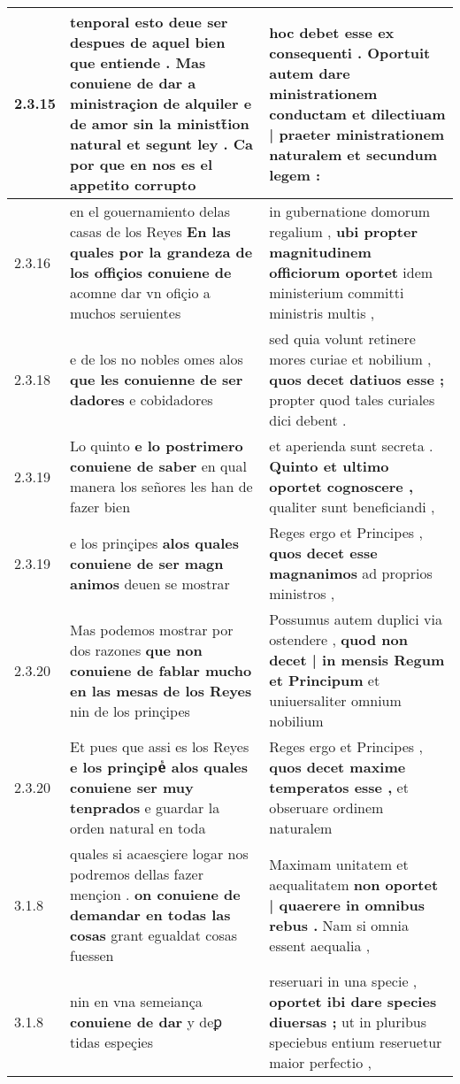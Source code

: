 \begin{tabular}{|p{1cm}|p{6.5cm}|p{6.5cm}|}
2.3.15 & tenporal esto deue ser despues de aquel bien que entiende . \textbf{ Mas conuiene de dar a ministraçion de alquiler e de amor sin la ministt̃ion natural et segunt ley . } Ca por que en nos es el appetito corrupto & hoc debet esse ex consequenti . \textbf{ Oportuit autem dare ministrationem conductam et dilectiuam | praeter ministrationem naturalem } et secundum legem : \\\hline
2.3.16 & en el gouernamiento delas casas de los Reyes \textbf{ En las quales por la grandeza de los offiçios conuiene de } acomne dar vn ofiçio a muchos seruientes & in gubernatione domorum regalium , \textbf{ ubi propter magnitudinem officiorum oportet } idem ministerium committi ministris multis , \\\hline
2.3.18 & e de los no nobles omes alos \textbf{ que les conuienne de ser dadores } e cobidadores & sed quia volunt retinere mores curiae et nobilium , \textbf{ quos decet datiuos esse ; } propter quod tales curiales dici debent . \\\hline
2.3.19 & Lo quinto \textbf{ e lo postrimero conuiene de saber } en qual manera los señores les han de fazer bien & et aperienda sunt secreta . \textbf{ Quinto et ultimo oportet cognoscere , } qualiter sunt beneficiandi , \\\hline
2.3.19 & e los prinçipes \textbf{ alos quales conuiene de ser magn animos } deuen se mostrar & Reges ergo et Principes , \textbf{ quos decet esse magnanimos } ad proprios ministros , \\\hline
2.3.20 & Mas podemos mostrar por dos razones \textbf{ que non conuiene de fablar mucho en las mesas de los Reyes } nin de los prinçipes & Possumus autem duplici via ostendere , \textbf{ quod non decet | in mensis Regum et Principum } et uniuersaliter omnium nobilium \\\hline
2.3.20 & Et pues que assi es los Reyes \textbf{ e los prinçipeᷤ alos quales conuiene ser muy tenprados } e guardar la orden natural en toda & Reges ergo et Principes , \textbf{ quos decet maxime temperatos esse , } et obseruare ordinem naturalem \\\hline
3.1.8 & quales si acaesçiere logar nos podremos dellas fazer mençion . \textbf{ on conuiene de demandar en todas las cosas } grant egualdat cosas fuessen & Maximam unitatem et aequalitatem \textbf{ non oportet | quaerere in omnibus rebus . } Nam si omnia essent aequalia , \\\hline
3.1.8 & nin en vna semeiança \textbf{ conuiene de dar } y deꝑ tidas espeçies & reseruari in una specie , \textbf{ oportet ibi dare species diuersas ; } ut in pluribus speciebus entium reseruetur maior perfectio , \\\hline

\end{tabular}

